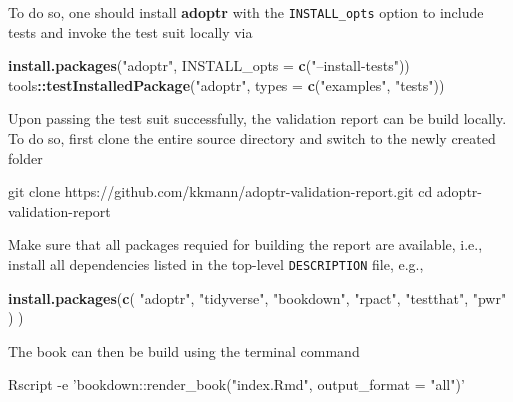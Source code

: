 \documentclass[
]{book}
\newenvironment{Shaded}{\begin{snugshade}}{\end{snugshade}}
\newcommand{\BuiltInTok}[1]{#1}
\newcommand{\DataTypeTok}[1]{\textcolor[rgb]{0.13,0.29,0.53}{#1}}
\newcommand{\ExtensionTok}[1]{#1}
\newcommand{\FunctionTok}[1]{\textcolor[rgb]{0.00,0.00,0.00}{#1}}
\newcommand{\KeywordTok}[1]{\textcolor[rgb]{0.13,0.29,0.53}{\textbf{#1}}}
\newcommand{\NormalTok}[1]{#1}
\newcommand{\OperatorTok}[1]{\textcolor[rgb]{0.81,0.36,0.00}{\textbf{#1}}}
\newcommand{\StringTok}[1]{\textcolor[rgb]{0.31,0.60,0.02}{#1}}
\begin{document}
To do so, one should install \textbf{adoptr} with the \texttt{INSTALL\_opts} option
to include tests and invoke the test suit locally via

\begin{Shaded}
\begin{Highlighting}[]
\KeywordTok{install.packages}\NormalTok{(}\StringTok{"adoptr"}\NormalTok{, }\DataTypeTok{INSTALL_opts =} \KeywordTok{c}\NormalTok{(}\StringTok{"--install-tests"}\NormalTok{))}
\NormalTok{tools}\OperatorTok{::}\KeywordTok{testInstalledPackage}\NormalTok{(}\StringTok{"adoptr"}\NormalTok{, }\DataTypeTok{types =} \KeywordTok{c}\NormalTok{(}\StringTok{"examples"}\NormalTok{, }\StringTok{"tests"}\NormalTok{))}
\end{Highlighting}
\end{Shaded}

Upon passing the test suit successfully, the validation report
can be build locally.
To do so, first clone the entire source directory and switch
to the newly created folder

\begin{Shaded}
\begin{Highlighting}[]
\FunctionTok{git}\NormalTok{ clone https://github.com/kkmann/adoptr-validation-report.git}
\BuiltInTok{cd}\NormalTok{ adoptr-validation-report}
\end{Highlighting}
\end{Shaded}

Make sure that all packages requied for building the report are
available, i.e., install all dependencies listed in the top-level
\texttt{DESCRIPTION} file, e.g.,

\begin{Shaded}
\begin{Highlighting}[]
\KeywordTok{install.packages}\NormalTok{(}\KeywordTok{c}\NormalTok{(}
    \StringTok{"adoptr"}\NormalTok{, }
    \StringTok{"tidyverse"}\NormalTok{, }
    \StringTok{"bookdown"}\NormalTok{, }
    \StringTok{"rpact"}\NormalTok{, }
    \StringTok{"testthat"}\NormalTok{, }
    \StringTok{"pwr"}\NormalTok{ ) )}
\end{Highlighting}
\end{Shaded}

The book can then be build using the terminal command

\begin{Shaded}
\begin{Highlighting}[]
\ExtensionTok{Rscript}\NormalTok{ -e }\StringTok{'bookdown::render_book("index.Rmd", output_format = "all")'}
\end{Highlighting}
\end{Shaded}
\end{document}
